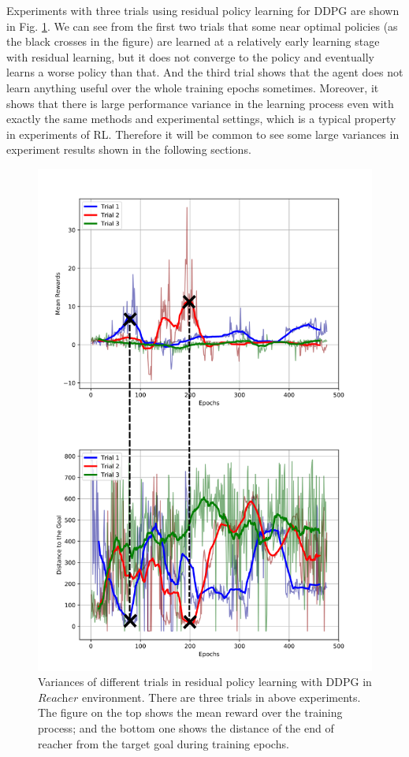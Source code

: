 \documentclass{article}
\begin{document}
Experiments with three trials using residual policy learning for DDPG are shown in Fig. \ref{fig:variance}. We can see from the first two trials that some near optimal policies (as the black crosses in the figure) are learned at a relatively early learning stage with residual learning, but it does not converge to the policy and eventually learns a worse policy than that. And the third trial shows that the agent does not learn anything useful over the whole training epochs sometimes. Moreover, it shows that there is large performance variance in the learning process even with exactly the same methods and experimental settings, which is a typical property in experiments of RL. Therefore it will be common to see some large variances in experiment results shown in the following sections.

\begin{figure}[H]
	\centering
	\includegraphics[scale=0.6]{img/variance.png}
	\caption{Variances of different trials in residual policy learning with DDPG in $\textit{Reacher}$ environment. There are three trials in above experiments. The figure on the top shows the mean reward over the training process; and the bottom one shows the distance of the end of reacher from the target goal during training epochs.}
	\label{fig:variance}
\end{figure}
\end{document}
